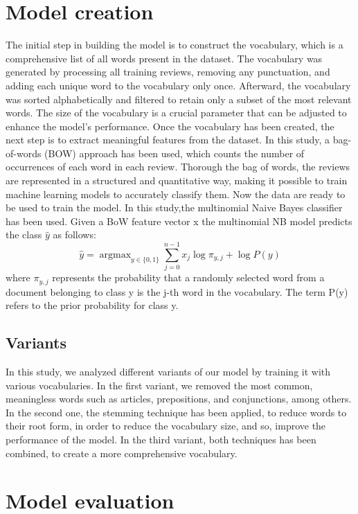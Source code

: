\documentclass[eng]{class}
\begin{document}
\section{Model creation}
The initial step in building the model is to construct the vocabulary, which is a comprehensive list of all words present in the dataset.
The vocabulary was generated by processing all training reviews, removing any punctuation, and adding each unique word to the vocabulary only once.\newline
Afterward, the vocabulary was sorted alphabetically and filtered to retain only a subset of the most relevant words.
The size of the vocabulary is a crucial parameter that can be adjusted to enhance the model's performance.\newline
Once the vocabulary has been created, the next step is to extract meaningful features from the dataset.
In this study, a bag-of-words (BOW) approach has been used, which counts the number of occurrences of each word in each review.
Thorough the bag of words, the reviews are represented in a structured and quantitative way, making it possible to train machine learning models to accurately classify them.\newline
Now the data are ready to be used to train the model. In this study,the multinomial Naive Bayes classifier has been used.
Given a BoW feature vector x the multinomial NB model predicts the class $\hat{y}$ as follows:
\begin{equation}
  \hat{y} = \mathop{argmax}_{y \in \{0,1\}} \sum_{j=0}^{n-1} x_j \log\pi_{y,j}+\log P(y)
\end{equation}
where $\pi_{y,j}$ represents the probability that a randomly selected word from a document belonging to class y is the j-th word in the vocabulary.
The term P(y) refers to the prior probability for class y.
\subsection{Variants}
In this study, we analyzed different variants of our model by training it with various vocabularies.
In the first variant, we removed the most common, meaningless words such as articles, prepositions, and conjunctions, among others.
In the second one, the stemming technique has been applied, to reduce words to their root form, in order to reduce the vocabulary size, and so, improve the performance of the model.
In the third variant, both techniques has been combined, to create a more comprehensive vocabulary.
\pagestyle{OtherPage}
\section{Model evaluation}
\end{document}
